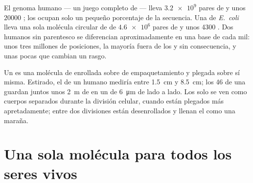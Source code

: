 \begin{example}[Cifras]\label{ex:g10:universal-dna:numbers}
El genoma humano --- un juego completo de  --- lleva
$\num{3.2e9}$ pares de  y unos $\num{20000}$ ; los 
ocupan solo un pequeño porcentaje de la secuencia. Una  de
\emph{E.~coli} lleva una sola molécula circular de  de $\num{4.6e6}$
pares de  y unos 4300 . Dos humanos sin parentesco se
diferencian aproximadamente en una base de cada mil: unos tres millones
de posiciones, la mayoría fuera de los  y sin consecuencia, y unas
pocas  que cambian un rasgo.
\end{example}

\begin{proposition}[Cromosomas]\label{prop:g10:universal-dna:chromosome}
Un  es una molécula de  enrollada sobre  de
empaquetamiento y plegada sobre sí misma. Estirado, el  de un
 humano mediría entre \qty{1.5}{cm} y \qty{8.5}{cm}; los 46
 de una  guardan juntos unos \qty{2}{m} de  en un
 de \qty{6}{\micro m} de lado a lado. Los  solo se ven
como cuerpos separados durante la división celular, cuando están
plegados más apretadamente; entre dos divisiones están desenrollados y
llenan el  como una maraña.
\end{proposition}
\admitted

\section{Una sola molécula para todos los seres vivos}

